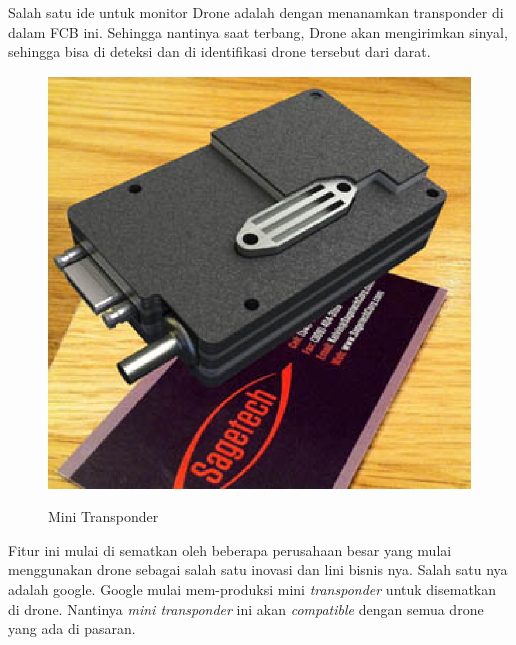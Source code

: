 \documentclass[9pt,twocolumn,twoside]{Gunadarma}
\begin{document}
Salah satu ide untuk monitor Drone adalah dengan menanamkan transponder di dalam FCB ini. Sehingga nantinya saat terbang, Drone akan mengirimkan sinyal, sehingga bisa di deteksi dan di identifikasi drone tersebut dari darat. 

\begin{figure}[htbp]
	\begin{center}
		\includegraphics[width=1\columnwidth]{transponder.eps} \label{fig:1-noFCase1}
	\end{center}
	\caption{Mini Transponder}
\end{figure}


Fitur ini mulai di sematkan oleh beberapa perusahaan besar yang mulai menggunakan drone sebagai salah satu inovasi dan lini bisnis nya. Salah satu nya adalah google. Google mulai mem-produksi mini \textit{transponder} untuk disematkan di drone. Nantinya \textit{mini transponder} ini akan \textit{compatible} dengan semua drone yang ada di pasaran. 
\end{document}
